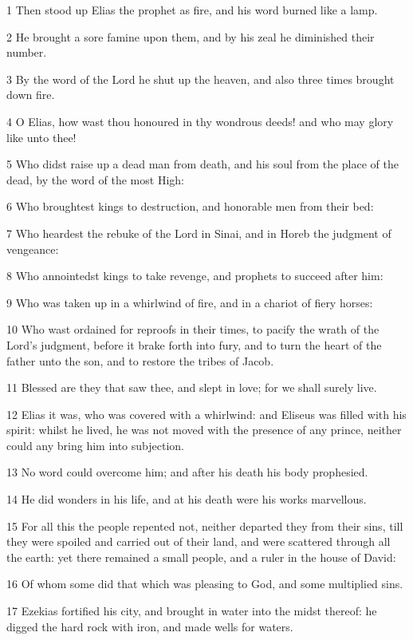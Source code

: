 \par 1 Then stood up Elias the prophet as fire, and his word burned like a lamp.
\par 2 He brought a sore famine upon them, and by his zeal he diminished their number.
\par 3 By the word of the Lord he shut up the heaven, and also three times brought down fire.
\par 4 O Elias, how wast thou honoured in thy wondrous deeds! and who may glory like unto thee!
\par 5 Who didst raise up a dead man from death, and his soul from the place of the dead, by the word of the most High:
\par 6 Who broughtest kings to destruction, and honorable men from their bed:
\par 7 Who heardest the rebuke of the Lord in Sinai, and in Horeb the judgment of vengeance:
\par 8 Who annointedst kings to take revenge, and prophets to succeed after him:
\par 9 Who was taken up in a whirlwind of fire, and in a chariot of fiery horses:
\par 10 Who wast ordained for reproofs in their times, to pacify the wrath of the Lord's judgment, before it brake forth into fury, and to turn the heart of the father unto the son, and to restore the tribes of Jacob.
\par 11 Blessed are they that saw thee, and slept in love; for we shall surely live.
\par 12 Elias it was, who was covered with a whirlwind: and Eliseus was filled with his spirit: whilst he lived, he was not moved with the presence of any prince, neither could any bring him into subjection.
\par 13 No word could overcome him; and after his death his body prophesied.
\par 14 He did wonders in his life, and at his death were his works marvellous.
\par 15 For all this the people repented not, neither departed they from their sins, till they were spoiled and carried out of their land, and were scattered through all the earth: yet there remained a small people, and a ruler in the house of David:
\par 16 Of whom some did that which was pleasing to God, and some multiplied sins.
\par 17 Ezekias fortified his city, and brought in water into the midst thereof: he digged the hard rock with iron, and made wells for waters.
